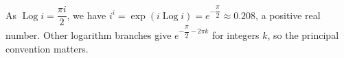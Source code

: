 As $\operatorname{Log}i=\dfrac{\pi i}{2}$, we have $i^i=\exp(i\operatorname{Log}i)=\boxed{e^{-\dfrac{\pi}{2}}}\approx0.208$, a positive real number. Other logarithm branches give $e^{-\dfrac{\pi}{2}-2\pi k}$ for integers $k$, so the principal convention matters.
